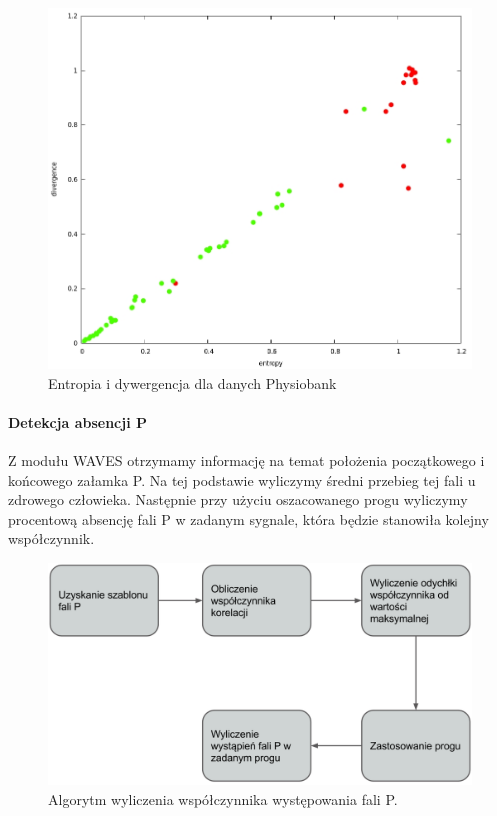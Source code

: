 \begin{figure}[ht]
\centering
\includegraphics[width=12cm]{ATRIAL_FIBR/img/RRResults}
\caption{Entropia i dywergencja dla danych Physiobank}
\label{fig:RRResults}
\end{figure}

\paragraph{Detekcja absencji P}
Z modułu WAVES otrzymamy informację na temat położenia początkowego i końcowego załamka P. 
Na tej podstawie wyliczymy średni przebieg tej fali u zdrowego człowieka. 
Następnie przy użyciu oszacowanego progu wyliczymy procentową absencję fali P w zadanym sygnale, 
która będzie stanowiła kolejny współczynnik.
\begin{figure}
  \centering
  \includegraphics[width=12cm]{ATRIAL_FIBR/img/PMethodFlow}
  \caption{Algorytm wyliczenia współczynnika występowania fali P.}
\end{figure}

